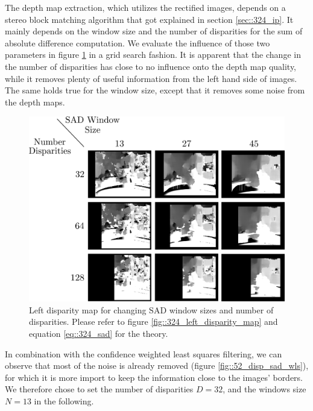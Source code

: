 The depth map extraction, which utilizes the rectified images, depends on a stereo block matching algorithm that got explained in section \ref{sec::324_ip}. It mainly depends on the window size and the number of disparities for the sum of absolute difference computation. We evaluate the influence of those two parameters in figure \ref{fig::52_disp_sad} in a grid search fashion. It is apparent that the change in the number of disparities has close to no influence onto the depth map quality, while it removes plenty of useful information from the left hand side of images. The same holds true for the window size, except that it removes some noise from the depth maps.
\begin{figure}[h]
	\centering
	\includegraphics[scale=.25]{chapters/05_experiments/02_depth_map_parameter_tuning/disp_sad.png}
	\caption{Left disparity map for changing SAD window sizes and number of disparities. Please refer to figure \ref{fig::324_left_disparity_map} and equation \ref{eq::324_sad} for the theory.}
	\label{fig::52_disp_sad}
\end{figure}
In combination with the confidence weighted least squares filtering, we can observe that most of the noise is already removed (figure \ref{fig::52_disp_sad_wls}), for which it is more import to keep the information close to the images' borders. We therefore chose to set the number of disparities $D=32$, and the windows size $N=13$ in the following.
